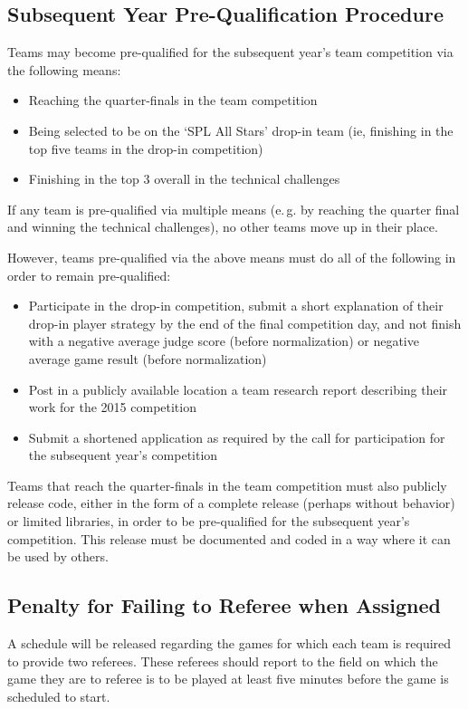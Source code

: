 \documentclass[12pt]{article}
\newcommand{\eg}{\mbox{e.\,g.}\xspace}
\begin{document}
\subsection{Subsequent Year Pre-Qualification Procedure}
\label{sec:preQual}
Teams may become pre-qualified for the subsequent year's team competition via the following means:
\begin{itemize}
\item Reaching the quarter-finals in the team competition
\item Being selected to be on the `SPL All Stars' drop-in team (ie, finishing in the top five teams in the drop-in competition)
\item Finishing in the top 3 overall in the technical challenges
\end{itemize}
If any team is pre-qualified via multiple means (\eg by reaching the quarter final and winning the technical challenges), no other teams move up in their place.

However, teams pre-qualified via the above means must do all of the following in order to remain pre-qualified:
\begin{itemize}
\item Participate in the drop-in competition, submit a short explanation of their drop-in player strategy by the end of the final competition day, and not finish with a negative average judge score (before normalization) or negative average game result (before normalization)
\item Post in a publicly available location a team research report describing their work for the 2015 competition
\item Submit a shortened application as required by the call for participation for the subsequent year's competition
\end{itemize}

Teams that reach the quarter-finals in the team competition must also publicly release code, either in the form of a complete release (perhaps without behavior) or limited libraries, in order to be pre-qualified for the subsequent year's competition.  This release must be documented and coded in a way where it can be used by others.

\subsection{Penalty for Failing to Referee when Assigned}
\label{sec:refPenalty}
A schedule will be released regarding the games for which each team is required to provide two referees.  These referees should report to the field on which the game they are to referee is to be played at least five minutes before the game is scheduled to start.
\end{document}
